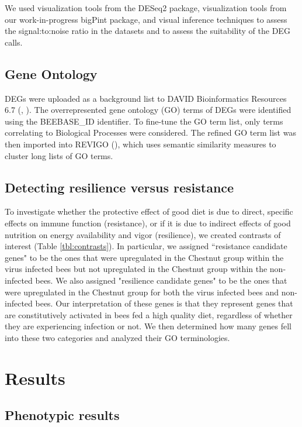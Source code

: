 \documentclass[11pt,a4paper,oldfontcommands,openany]{memoir}
\numberwithin{equation}{section} %
\begin{document}
We used visualization tools from the DESeq2 package, visualization tools from our work-in-progress bigPint package, and visual inference techniques to assess the signal:to:noise ratio in the datasets and to assess the suitability of the DEG calls. 

\subsection{Gene Ontology}

DEGs were uploaded as a background list to DAVID Bioinformatics Resources 6.7 (\citealt{davidBio}, \citealt{davidBio2}). The overrepresented gene ontology (GO) terms of DEGs were identified using the BEEBASE\_ID identifier. To fine-tune the GO term list, only terms correlating to Biological Processes were considered. The refined GO term list was then imported into REVIGO (\citealt{revigo}), which uses semantic similarity measures to cluster long lists of GO terms.

\subsection{Detecting resilience versus resistance}

To investigate whether the protective effect of good diet is due to direct, specific effects on immune function (resistance), or if it is due to indirect effects of good nutrition on energy availability and vigor (resilience), we created contrasts of interest (Table \ref{tbl:contrasts}). In particular, we assigned ``resistance candidate genes" to be the ones that were upregulated in the Chestnut group within the virus infected bees but not upregulated in the Chestnut group within the non-infected bees. We also assigned "resilience candidate genes" to be the ones that were upregulated in the Chestnut group for both the virus infected bees and non-infected bees. Our interpretation of these genes is that they represent genes that are constitutively activated in bees fed a high quality diet, regardless of whether they are experiencing infection or not. We then determined how many genes fell into these two categories and analyzed their GO terminologies.

\section{Results}

\subsection{Phenotypic results}
\end{document}
